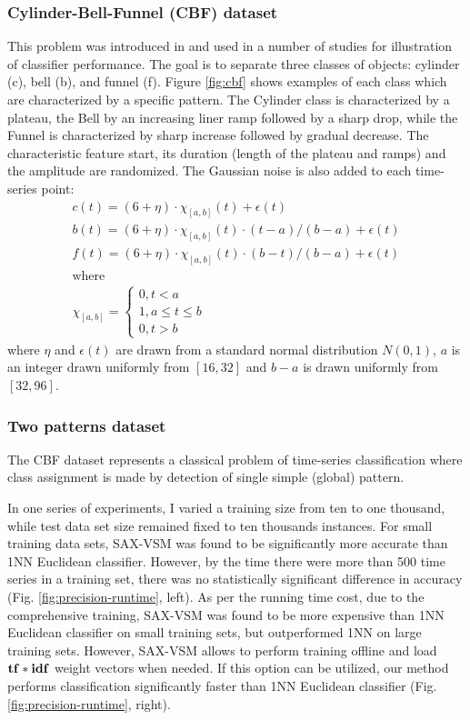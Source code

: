 \subsubsection{Cylinder-Bell-Funnel (CBF) dataset}
This problem was introduced in \cite{} and used in a number of studies for illustration of classifier performance.
The goal is to separate three classes of objects: cylinder (c), bell (b), and funnel (f).  Figure \ref{fig:cbf} 
shows examples of each class which are characterized by a specific pattern. 
The Cylinder class is characterized by a plateau, the Bell by an increasing liner ramp followed by a sharp drop, 
while the Funnel is characterized by sharp increase followed by gradual decrease. The characteristic feature start,
its duration (length of the plateau and ramps) and the amplitude are randomized. The Gaussian noise is also added 
to each time-series point:
\begin{equation}
\label{eq:cbf}
\begin{split}
c(t)=(6+\eta)\cdot\chi_{[a,b]}(t)+\epsilon(t) \\
b(t)=(6+\eta)\cdot\chi_{[a,b]}(t)\cdot(t-a)/(b-a)+\epsilon(t) \\
f(t)=(6+\eta)\cdot\chi_{[a,b]}(t)\cdot(b-t)/(b-a)+\epsilon(t) \\
\text{where} \\
\chi_{[a,b]}=\begin{cases}
0,t < a \\
1,a\leq t\leq b\\
0,t > b \end{cases}
\end{split}                                                      
\end{equation}
where $\eta$ and $\epsilon(t)$ are drawn from a standard normal distribution $N(0,1)$, $a$ is an integer 
drawn uniformly from $[16,32]$ and $b-a$ is drawn uniformly from $[32,96]$.

\subsubsection{Two patterns dataset}
The CBF dataset represents a classical problem of time-series classification where class assignment is 
made by detection of single simple (global) pattern. 

In one series of experiments, I varied a training size from ten to one thousand, while test data set size 
remained fixed to ten thousands instances. 
For small training data sets, SAX-VSM was found to be significantly more accurate than 1NN Euclidean
classifier. However, by the time there were more than 500 time series in a training set, there was no
statistically significant difference in accuracy (Fig. \ref{fig:precision-runtime}, left). 
As per the running time cost, due to the comprehensive training, SAX-VSM was found to be more
expensive than 1NN Euclidean classifier on small training sets, but outperformed 1NN on large
training sets.
However, SAX-VSM allows to perform training offline and load $\text{\textbf{tf}}\ast\text{\textbf{idf}}$ 
weight vectors when needed. If this option can be utilized, our method performs classification significantly
faster than 1NN Euclidean classifier (Fig. \ref{fig:precision-runtime}, right).

